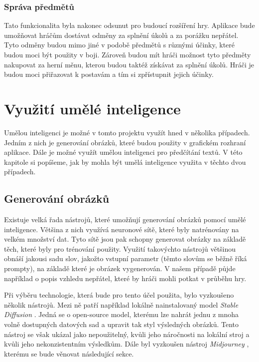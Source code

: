\subsubsection*{Správa předmětů}
Tato funkcionalita byla nakonec odsunut pro budoucí rozšíření hry. Aplikace bude umožňovat hráčům dostávat odměny za splnění úkolů a za porážku nepřátel. Tyto odměny budou mimo jiné v podobě předmětů s různými účinky, které budou moci být použity v boji. Zároveň budou mít hráči možnost tyto předměty nakupovat za herní měnu, kterou budou taktéž získávat za splnění úkolů. Hráči je budou moci přiřazovat k postavám a tím si zpřístupnit jejich účinky.

\section{Využití umělé inteligence}
Umělou inteligenci je možné v tomto projektu využít hned v několika případech. Jedním z nich je generování obrázků, které budou použity v grafickém rozhraní aplikace. Dále je možné využít umělou inteligenci pro předčítání textů. V této kapitole si popíšeme, jak by mohla být umělá inteligence využita v těchto dvou případech.

\subsection{Generování obrázků}\label{sec:image_generation}
Existuje velká řada nástrojů, které umožňují generování obrázků pomocí umělé inteligence. Většina z nich využívá neuronové sítě, které byly natrénovány na velkém množství dat. Tyto sítě jsou pak schopny generovat obrázky na základě těch, které byly pro trénování použity. Využití takovýchto nástrojů většinou obnáší jakousi sadu slov, jakožto vstupní parametr (těmto slovům se běžně říká prompty), na základě které je obrázek vygenerován. V našem případě půjde například o popis vzhledu nepřátel, které by hráči mohli potkat v průběhu hry.

Při výběru technologie, která bude pro tento účel použita, bylo vyzkoušeno několik nástrojů. Mezi ně patří například lokálně nainstalovaný model \textit{Stable Diffusion} \cite{stability_ai}. Jedná se o open-source model, kterému lze nahrát jednu z mnoha volně dostupných datových sad a upravit tak styl výsledných obrázků. Tento nástroj se však ukázal jako nepoužitelný, kvůli jeho náročnosti na lokální stroj a kvůli jeho nekonzistentním výsledkům. Dále byl vyzkoušen nástroj \textit{Midjourney} \cite*{midjourney}, kterému se bude věnovat následující sekce.

